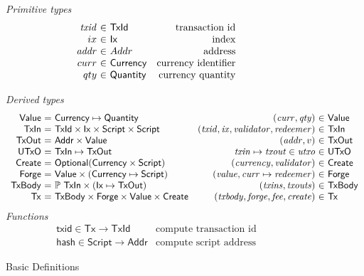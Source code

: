 \documentclass[11pt,a4paper]{article}
\newcommand{\powerset}[1]{\mathbb{P}~#1}
\newcommand{\var}[1]{\mathit{#1}}
\newcommand{\fun}[1]{\mathsf{#1}}
\newcommand{\type}[1]{\mathsf{#1}}
\newcommand{\Script}{\type{Script}}
\newcommand{\TxId}{\type{TxId}}
\newcommand{\Ix}{\type{Ix}}
\newcommand{\Addr}{\type{Addr}}
\newcommand{\Currency}{\type{Currency}}
\newcommand{\Quantity}{\type{Quantity}}
\newcommand{\Value}{\type{Value}}
\newcommand{\TxIn}{\type{TxIn}}
\newcommand{\TxOut}{\type{TxOut}}
\newcommand{\UTxO}{\type{UTxO}}
\newcommand{\Create}{\type{Create}}
\newcommand{\Forge}{\type{Forge}}
\newcommand{\TxBody}{\type{TxBody}}
\newcommand{\Tx}{\type{Tx}}
\begin{document}
\begin{figure}

\emph{Primitive types}
%
\begin{equation*}
\begin{array}{r@{~\in~}lr}
  \var{txid}
& \TxId
& \text{transaction id}
\\
  ix
& \Ix
& \text{index}
\\
  \var{addr}
& Addr
& \text{address}
\\
  curr
& \Currency
& \text{currency identifier}
\\
  qty
& \Quantity
& \text{currency quantity}
\end{array}
\end{equation*}

%
\emph{Derived types}
%
\begin{equation*}
\begin{array}{r@{~=~}lc@{}r@{~\in~}l}
  \Value
& \Currency \mapsto \Quantity
&
& (\var{curr}, \var{qty})
& \Value
\\
  \TxIn
& \TxId \times \Ix \times \Script \times \Script
&
& (\var{txid}, \var{ix}, \var{validator}, \var{redeemer})
& \TxIn
\\
  \TxOut
& \Addr \times \Value
&
& (\var{addr}, v)
& \TxOut
\\
  \UTxO
& \TxIn \mapsto \TxOut
&
& \var{txin} \mapsto \var{txout} \in \var{utxo}
& \UTxO
\\
  \Create
& \type{Optional} (\Currency \times \Script)
&
& (\var{currency}, \var{validator})
& \Create
\\
  \Forge
& \Value \times (\Currency \mapsto \Script)
&
& (\var{value}, \var{curr} \mapsto \var{redeemer})
& \Forge
\\
  \TxBody
& \powerset{\TxIn} \times (\Ix \mapsto \TxOut)
&
& (\var{txins}, \var{txouts})
& \TxBody
\\
  \Tx
& \TxBody \times \Forge \times \Value \times \Create
&
& (\var{txbody}, \var{forge}, \var{fee}, \var{create})
& \Tx
\end{array}
\end{equation*}
%
\emph{Functions}
%
\begin{equation*}
\begin{array}{lr}
  \fun{txid} \in \Tx \to \TxId
& \text{compute transaction id}
\\
  \fun{hash} \in \Script \to \Addr
& \text{compute script address}
\end{array}
\end{equation*}

\caption{Basic Definitions}
\label{fig:basic_definitions}
\end{figure}
\end{document}
